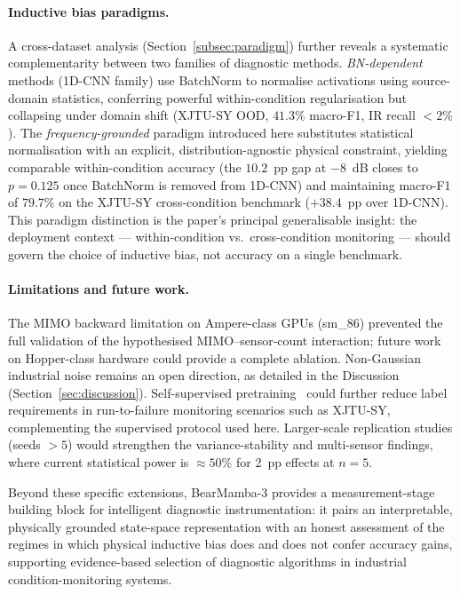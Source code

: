 \paragraph{Inductive bias paradigms.}
A cross-dataset analysis (Section~\ref{subsec:paradigm}) further reveals a
systematic complementarity between two families of diagnostic methods.
\emph{BN-dependent} methods (1D-CNN family) use BatchNorm to normalise
activations using source-domain statistics, conferring powerful within-condition
regularisation but collapsing under domain shift (XJTU-SY OOD, $41.3\%$
macro-F1, IR recall $< 2\%$).
The \emph{frequency-grounded} paradigm introduced here substitutes statistical
normalisation with an explicit, distribution-agnostic physical constraint,
yielding comparable within-condition accuracy (the $10.2$~pp gap at $-8$~dB
closes to $p=0.125$ once BatchNorm is removed from 1D-CNN) and maintaining
macro-F1 of $79.7\%$ on the XJTU-SY cross-condition benchmark ($+38.4$~pp
over 1D-CNN).
This paradigm distinction is the paper's principal generalisable insight:
the deployment context --- within-condition vs.\ cross-condition monitoring ---
should govern the choice of inductive bias, not accuracy on a single benchmark.

\paragraph{Limitations and future work.}
The MIMO backward limitation on Ampere-class GPUs (sm\_86) prevented the full
validation of the hypothesised MIMO--sensor-count interaction; future work on
Hopper-class hardware could provide a complete ablation.
Non-Gaussian industrial noise remains an open direction, as detailed
in the Discussion (Section~\ref{sec:discussion}).
Self-supervised pretraining~\cite{ding2022ssl,wan2022siamese} could further
reduce label requirements in run-to-failure monitoring scenarios such as
XJTU-SY, complementing the supervised protocol used here.
Larger-scale replication studies (seeds $> 5$) would strengthen the
variance-stability and multi-sensor findings, where current statistical
power is $\approx 50\%$ for 2~pp effects at $n=5$.

Beyond these specific extensions, BearMamba-3 provides a
measurement-stage building block for intelligent diagnostic
instrumentation: it pairs an interpretable, physically grounded
state-space representation with an honest assessment of the regimes
in which physical inductive bias does and does not confer accuracy
gains, supporting evidence-based selection of diagnostic algorithms
in industrial condition-monitoring systems.
